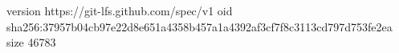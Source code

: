 version https://git-lfs.github.com/spec/v1
oid sha256:37957b04cb97e22d8e651a4358b457a1a4392af3cf7f8c3113cd797d753fe2ea
size 46783
